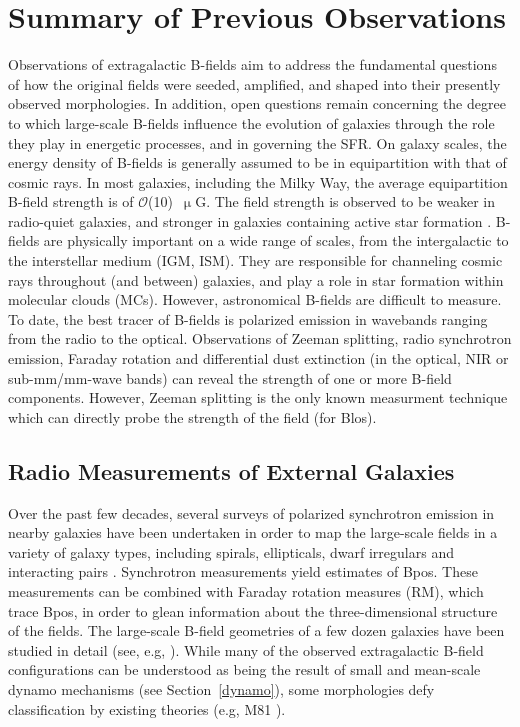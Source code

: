 \section{Summary of Previous Observations}\label{previous obs}

Observations of extragalactic B-fields aim to address the fundamental questions of how the original fields were seeded, amplified, and shaped into their presently observed morphologies. In addition, open questions remain concerning the degree to which large-scale B-fields influence the evolution of galaxies through the role they play in energetic processes, and in governing the SFR. On galaxy scales, the energy density of B-fields is generally assumed to be in equipartition with that of cosmic rays. In most galaxies, including the Milky Way, the average equipartition B-field strength is of $\mathcal{O}$(10)~$\upmu$G. The field strength is observed to be weaker in radio-quiet galaxies, and stronger in galaxies containing active star formation \citep{beck2016magnetic}. B-fields are physically important on a wide range of scales, from the intergalactic to the interstellar medium (IGM, ISM). They are responsible for channeling cosmic rays throughout (and between) galaxies, and play a role in star formation within molecular clouds (MCs). However, astronomical B-fields are difficult to measure. To date, the best tracer of B-fields is polarized emission in wavebands ranging from the radio to the optical. Observations of Zeeman splitting, radio synchrotron emission, Faraday rotation and differential dust extinction (in the optical, NIR or sub-mm/mm-wave bands) can reveal the strength of one or more B-field components. However, Zeeman splitting is the only known measurment technique which can directly probe the strength of the field (for \gls{Blos}).

\subsection{Radio Measurements of External Galaxies}
Over the past few decades, several surveys of polarized synchrotron emission in nearby galaxies have been undertaken in order to map the large-scale fields in a variety of galaxy types, including spirals, ellipticals, dwarf irregulars and interacting pairs \citep{van2015magnetic}. Synchrotron measurements yield estimates of \gls{Bpos}. These measurements can be combined with Faraday rotation measures (RM), which trace \gls{Bpos}, in order to glean information about the three-dimensional structure of the fields. The large-scale B-field geometries of a few dozen galaxies have been studied in detail (see, e.g, \citet{sofue1985large,beck2005magnetic,beck2016magnetic}). While many of the observed extragalactic B-field configurations can be understood as being the result of small and mean-scale dynamo mechanisms (see Section~\ref{dynamo}), some morphologies defy classification by existing theories (e.g, M81 \citet{beck2006origin}).

